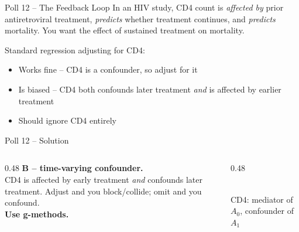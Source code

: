 \documentclass[aspectratio=169]{beamer}
\begin{document}
\begin{frame}{Poll 12 \;--\; The Feedback Loop}
  \small
  In an HIV study, CD4 count is \emph{affected by} prior antiretroviral
  treatment, \emph{predicts} whether treatment continues, and \emph{predicts}
  mortality. You want the effect of sustained treatment on mortality.
  \vspace{0.8em}

  Standard regression adjusting for CD4:
  \begin{itemize}
    \item[\textbf{A.}] Works fine -- CD4 is a confounder, so adjust for it
    \item[\textbf{B.}] Is biased -- CD4 both confounds later treatment \emph{and} is affected by earlier treatment
    \item[\textbf{C.}] Should ignore CD4 entirely
  \end{itemize}
\end{frame}

\begin{frame}{Poll 12 \;--\; Solution}
  \small
  \begin{columns}[T]
    \begin{column}{0.48\textwidth}
      \textcolor{good}{\textbf{B -- time-varying confounder.}}\\[0.4em]
      CD4 is affected by early treatment \emph{and} confounds later treatment.
      Adjust and you block/collide; omit and you confound.\\[0.2em]
      \textcolor{accent}{\textbf{Use g-methods.}}
    \end{column}
    \begin{column}{0.48\textwidth}
      \centering
      \\[0.2em]
      {\scriptsize CD4: mediator of $A_0$, confounder of $A_1$}
    \end{column}
  \end{columns}
\end{frame}
\end{document}

